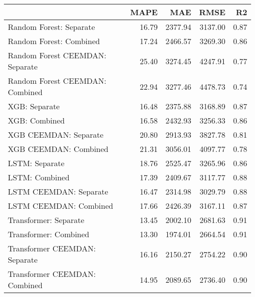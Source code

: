 \begin{tabular}{lrrrr}
\toprule
{} &  MAPE &     MAE &    RMSE &   R2 \\
\midrule
Random Forest: Separate         & 16.79 & 2377.94 & 3137.00 & 0.87 \\
Random Forest: Combined         & 17.24 & 2466.57 & 3269.30 & 0.86 \\
Random Forest CEEMDAN: Separate & 25.40 & 3274.45 & 4247.91 & 0.77 \\
Random Forest CEEMDAN: Combined & 22.94 & 3277.46 & 4478.73 & 0.74 \\
XGB: Separate                   & 16.48 & 2375.88 & 3168.89 & 0.87 \\
XGB: Combined                   & 16.58 & 2432.93 & 3256.33 & 0.86 \\
XGB CEEMDAN: Separate           & 20.80 & 2913.93 & 3827.78 & 0.81 \\
XGB CEEMDAN: Combined           & 21.31 & 3056.01 & 4097.77 & 0.78 \\
LSTM: Separate                  & 18.76 & 2525.47 & 3265.96 & 0.86 \\
LSTM: Combined                  & 17.39 & 2409.67 & 3117.77 & 0.88 \\
LSTM CEEMDAN: Separate          & 16.47 & 2314.98 & 3029.79 & 0.88 \\
LSTM CEEMDAN: Combined          & 17.66 & 2426.39 & 3167.11 & 0.87 \\
Transformer: Separate           & 13.45 & 2002.10 & 2681.63 & 0.91 \\
Transformer: Combined           & 13.30 & 1974.01 & 2664.54 & 0.91 \\
Transformer CEEMDAN: Separate   & 16.16 & 2150.27 & 2754.22 & 0.90 \\
Transformer CEEMDAN: Combined   & 14.95 & 2089.65 & 2736.40 & 0.90 \\
\bottomrule
\end{tabular}
